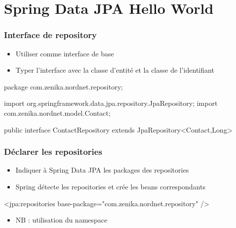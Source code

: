 \section{Spring Data JPA Hello World}



\begin{frame}[fragile]
 \frametitle{Interface de repository}
 \begin{itemize}
  \item Utiliser  comme interface de base
  \item Typer l'interface avec la classe d'entité et la classe de l'identifiant
 \end{itemize}
 
 \begin{javacode}
package com.zenika.nordnet.repository;

import org.springframework.data.jpa.repository.JpaRepository;
import com.zenika.nordnet.model.Contact;

public interface ContactRepository 
       extends JpaRepository<Contact,Long> {

}
 \end{javacode}

\end{frame}

\begin{frame}[fragile]
 \frametitle{Déclarer les repositories}
 \begin{itemize}
  \item Indiquer à Spring Data JPA les packages des repositories
  \item Spring détecte les repositories et crée les beans correspondants
 \end{itemize}

\begin{xmlcode}
<jpa:repositories base-package="com.zenika.nordnet.repository" />
\end{xmlcode}

 \begin{itemize}
  \item NB : utilisation du namespace 
 \end{itemize}

\end{frame}

